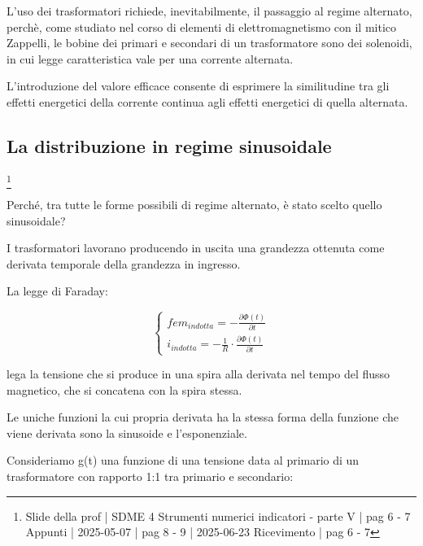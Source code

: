 L'uso dei trasformatori richiede, inevitabilmente, il passaggio al regime alternato, perchè, come studiato nel corso di elementi di elettromagnetismo con il mitico Zappelli, 
le bobine dei primari e secondari di un trasformatore sono dei solenoidi, in cui legge caratteristica vale per una corrente alternata. \newline 

L'introduzione del valore efficace consente di esprimere la similitudine tra gli effetti energetici della corrente continua agli effetti energetici di quella alternata. \newline 

\newpage 

\subsection{La distribuzione in regime sinusoidale}
\footnote{Slide della prof | SDME 4 Strumenti numerici indicatori - parte V | pag 6 - 7 \\  
Appunti | 2025-05-07 | pag 8 - 9 | 2025-06-23 Ricevimento | pag 6 - 7}

Perché, tra tutte le forme possibili di regime alternato, è stato scelto quello sinusoidale? \newline 

I trasformatori lavorano producendo in uscita una grandezza ottenuta come derivata temporale della grandezza in ingresso. \newline 

La legge di Faraday: 

{
    \Large 
    \begin{equation}
        \begin{cases}
            fem_{indotta} = - \frac{\partial \Phi (t)}{\partial t}
            \\ 
            i_{indotta} = - \frac{1}{R} \cdot \frac{\partial \Phi (t)}{\partial t}
        \end{cases}
    \end{equation}
}

lega la tensione che si produce in una spira alla derivata nel tempo del flusso magnetico, che si concatena con la spira stessa. \newline 

Le uniche funzioni la cui propria derivata ha la stessa forma della funzione che viene derivata sono la sinusoide e l'esponenziale. \newline 

Consideriamo g(t) una funzione di una tensione data al primario di un trasformatore con rapporto 1:1 tra primario e secondario: 

